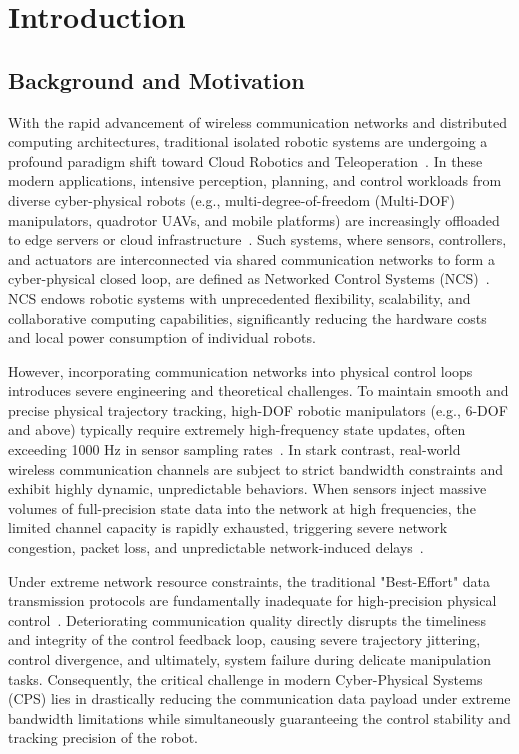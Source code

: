 \section{Introduction}
\subsection{Background and Motivation}
With the rapid advancement of wireless communication networks and distributed computing architectures, traditional isolated 
robotic systems are undergoing a profound paradigm shift toward Cloud Robotics and Teleoperation~\cite{intro_cr}. In these modern 
applications, intensive perception, planning, and control workloads from diverse cyber-physical robots (e.g., multi-degree-of-freedom (Multi-DOF) manipulators, quadrotor UAVs, and mobile platforms)
are increasingly offloaded to edge servers or cloud infrastructure~\cite{FaI}. Such systems, where sensors, controllers, and actuators 
are interconnected via shared communication networks to form a cyber-physical closed loop, are defined as Networked Control 
Systems (NCS)~\cite{intro_ncs}. NCS endows robotic systems with unprecedented flexibility, scalability, and collaborative computing capabilities,
significantly reducing the hardware costs and local power consumption of individual robots.

However, incorporating communication networks into physical control loops introduces severe engineering and theoretical challenges. 
To maintain smooth and precise physical trajectory tracking, high-DOF robotic manipulators (e.g., 6-DOF and above) typically require extremely high-frequency state updates, 
often exceeding 1000 Hz in sensor sampling rates~\cite{intro_ccc}. In stark contrast, real-world wireless communication channels are subject to strict bandwidth constraints and exhibit highly dynamic, unpredictable behaviors.
When sensors inject massive volumes of full-precision state data into the network at high frequencies, the limited channel capacity is rapidly exhausted, triggering severe network congestion, packet loss, and unpredictable network-induced delays~\cite{WNDC}.

Under extreme network resource constraints, the traditional "Best-Effort" data transmission protocols are fundamentally 
inadequate for high-precision physical control~\cite{intro_crc}. Deteriorating communication quality directly disrupts the timeliness and integrity of the control feedback loop, causing severe trajectory jittering, control divergence, and ultimately, system failure during delicate manipulation tasks.
Consequently, the critical challenge in modern Cyber-Physical Systems (CPS) lies in drastically reducing the communication data payload under extreme bandwidth limitations while simultaneously guaranteeing the control stability and tracking precision of the robot.
